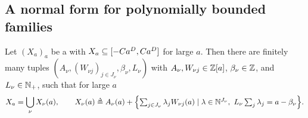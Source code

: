\subsection{A normal form for polynomially bounded families}
\begin{lemma}\label{lemma: simplex}
    Let $(X_a)_a$ be a  with $X_a \subseteq [-C a^{D}, C a^{D}]$ for large $a$.
    Then there are finitely many tuples $(A_\nu, (W_{\nu j})_{j \in J_\nu}, \beta_\nu, L_\nu)$ with $A_\nu, W_{\nu j} \in \mathbb{Z}[a]$, $\beta_\nu \in \mathbb{Z}$, and $L_\nu \in \mathbb{N}_{+}$, such that for large $a$
    \[X_a = \bigcup_{\nu} X_\nu(a), \qquad X_\nu(a) \defeq A_\nu(a) + \set*{\textstyle\sum_{j \in J_\nu} \lambda_j W_{\nu j}(a) \mid \lambda \in \nat^{J_\nu},\ L_\nu \sum_{j} \lambda_j = a - \beta_\nu}.\]
\end{lemma}
